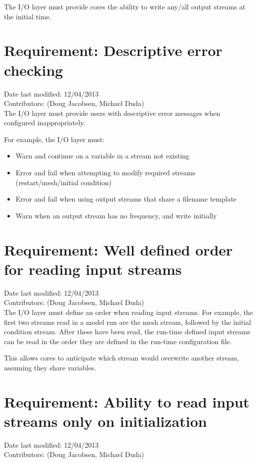 \documentclass[11pt]{report}
\begin{document}
The I/O layer must provide cores the ability to write any/all output streams at the initial time.

\section{Requirement: Descriptive error checking}
Date last modified: 12/04/2013 \\
Contributors: (Doug Jacobsen, Michael Duda) \\

The I/O layer must provide users with descriptive error messages when configured inappropriately.

For example, the I/O layer must:
\begin{itemize}
	\item Warn and continue on a variable in a stream not existing
	\item Error and fail when attempting to modify required streams (restart/mesh/initial condition)
	\item Error and fail when using output streams that share a filename template
	\item Warn when an output stream has no frequency, and write initially
\end{itemize}

\section{Requirement: Well defined order for reading input streams}
Date last modified: 12/04/2013 \\
Contributors: (Doug Jacobsen, Michael Duda) \\

The I/O layer must define an order when reading input streams. For example, the
first two streams read in a model run are the mesh stream, followed by the
initial condition stream. After these have been read, the run-time defined
input streams can be read in the order they are defined in the run-time
configuration file.

This allows cores to anticipate which stream would overwrite another stream,
assuming they share variables.

\section{Requirement: Ability to read input streams only on initialization}
Date last modified: 12/04/2013 \\
Contributors: (Doug Jacobsen, Michael Duda) \\
\end{document}
